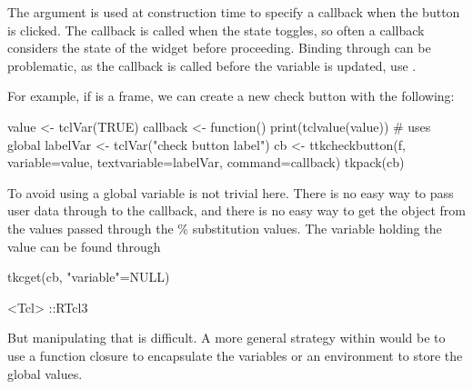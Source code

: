 The  argument is used at construction
time to specify a callback when the button is clicked. The callback is
called when the state toggles, so often a callback considers the
state of the widget before proceeding. Binding through  can be
problematic, as the callback is called before the variable is updated,
use .

For example, if  is a frame, we can create a new check button with the following:

\begin{Schunk}
\begin{Sinput}
 value <- tclVar(TRUE)
 callback <- function() print(tclvalue(value))     # uses global
 labelVar <- tclVar("check button label")
 cb <- ttkcheckbutton(f, variable=value, 
                      textvariable=labelVar, command=callback)
 tkpack(cb)
\end{Sinput}
\end{Schunk}

To avoid using a global variable is not trivial here. There is no easy way to pass user data through to the callback, and there is no easy way to get the \R\/ object from the values passed through the \% substitution values. The variable holding the value can be found through
\begin{Schunk}
\begin{Sinput}
 tkcget(cb, "variable"=NULL)
\end{Sinput}
\begin{Soutput}
<Tcl> ::RTcl3 
\end{Soutput}
\end{Schunk}

But manipulating that is difficult.  A more general strategy within
\R\/ would be to use a function closure to encapsulate the variables
or an environment to store the global values.




